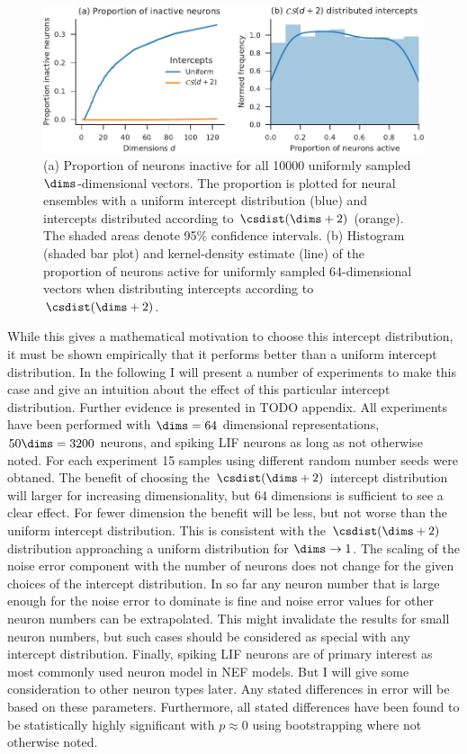 \begin{figure}
    \centering
    \includegraphics{figures/act-cs}
    \caption{(a) Proportion of neurons inactive for all \num{10000} uniformly sampled $\dims$-dimensional vectors. The proportion is plotted for neural ensembles with a uniform intercept distribution (blue) and intercepts distributed according to $\csdist(\dims + 2)$ (orange). The shaded areas denote 95\% confidence intervals. (b) Histogram (shaded bar plot) and kernel-density estimate (line) of the proportion of neurons active for uniformly sampled 64-dimensional vectors when distributing intercepts according to $\csdist(\dims + 2)$.}\label{fig:act-cs}
\end{figure}

While this gives a mathematical motivation to choose this intercept distribution, it must be shown empirically that it performs better than a uniform intercept distribution.
In the following I will present a number of experiments to make this case and give an intuition about the effect of this particular intercept distribution.
Further evidence is presented in TODO appendix.
All experiments have been performed with $\dims = 64$ dimensional representations, $50 \dims = 3200$ neurons, and spiking LIF neurons as long as not otherwise noted.
For each experiment 15 samples using different random number seeds were obtaned.
The benefit of choosing the $\csdist(\dims + 2)$ intercept distribution will larger for increasing dimensionality, but 64 dimensions is sufficient to see a clear effect.
For fewer dimension the benefit will be less, but not worse than the uniform intercept distribution.
This is consistent with the $\csdist(\dims + 2)$ distribution approaching a uniform distribution for $\dims \rightarrow 1$.
The scaling of the noise error component with the number of neurons does not change for the given choices of the intercept distribution.
In so far any neuron number that is large enough for the noise error to dominate is fine and noise error values for other neuron numbers can be extrapolated.
This might invalidate the results for small neuron numbers, but such cases should be considered as special with any intercept distribution.
Finally, spiking LIF neurons are of primary interest as most commonly used neuron model in NEF models.
But I will give some consideration to other neuron types later.
Any stated differences in error will be based on these parameters.
Furthermore, all stated differences have been found to be statistically highly significant with $p \approx 0$ using bootstrapping where not otherwise noted.

